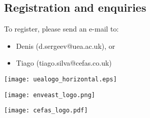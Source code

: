\documentclass[paper=a4]{scrartcl}
\newcommand*{\pyitem}{\item [{\texttt{[image: python\_logo.png]}}]}
\begin{document}
\subsection*{Registration and enquiries}
To register, please send an e-mail to:
\begin{itemize}
\pyitem Denis (d.sergeev@uea.ac.uk), or
\pyitem Tiago (tiago.silva@cefas.co.uk)
\end{itemize}

\begin{center}
\begin{minipage}{0.2\linewidth}
    \texttt{[image: uealogo\_horizontal.eps]}
\end{minipage}
\hspace{2cm}
\begin{minipage}{0.2\linewidth}
    \texttt{[image: enveast\_logo.png]}
\end{minipage}
\hspace{2cm}
\begin{minipage}{0.2\linewidth}
    \texttt{[image: cefas\_logo.pdf]}
\end{minipage}
\end{center}
\end{document}
